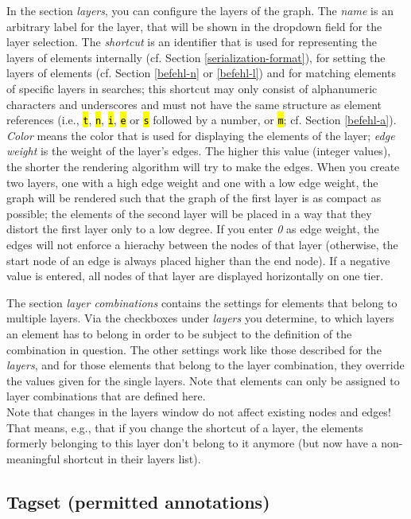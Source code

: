 \documentclass[12pt]{scrartcl}
\newcommand{\code}[1]{\hl{\texttt{#1}}}
\begin{document}
In the section \textit{layers}, you can configure the layers of the graph.
The \textit{name} is an arbitrary label for the layer, that will be shown in the dropdown field for the layer selection.
The \textit{shortcut} is an identifier that is used for representing the layers of elements internally (cf. Section \ref{serialization-format}), for setting the layers of elements (cf. Section \ref{befehl-n} or \ref{befehl-l}) and for matching elements of specific layers in searches; this shortcut may only consist of alphanumeric characters and underscores and must not have the same structure as element references (i.e., \code{t}, \code{n}, \code{i}, \code{e} or \code{s} followed by a number, or  \code{m}; cf. Section \ref{befehl-a}).
\textit{Color} means the color that is used for displaying the elements of the layer; \textit{edge weight} is the weight of the layer’s edges.
The higher this value (integer values), the shorter the rendering algorithm will try to make the edges.
When you create two layers, one with a high edge weight and one with a low edge weight, the graph will be rendered such that the graph of the first layer is as compact as possible; the elements of the second layer will be placed in a way that they distort the first layer only to a low degree.
If you enter \textit{0} as edge weight, the edges will not enforce a hierachy between the nodes of that layer (otherwise, the start node of an edge is always placed higher than the end node).
If a negative value is entered, all nodes of that layer are displayed horizontally on one tier.

The section \textit{layer combinations} contains the settings for elements that belong to multiple layers.
Via the checkboxes under \textit{layers} you determine, to which layers an element has to belong in order to be subject to the definition of the combination in question.
The other settings work like those described for the \textit{layers}, and for those elements that belong to the layer combination, they override the values given for the single layers.
Note that elements can only be assigned to layer combinations that are defined here.\\

Note that changes in the layers window do not affect existing nodes and edges!
That means, e.g., that if you change the shortcut of a layer, the elements formerly belonging to this layer don’t belong to it anymore (but now have a non-meaningful shortcut in their layers list).


\subsection{Tagset (permitted annotations)}\label{erlaubteannotationen}
\end{document}
